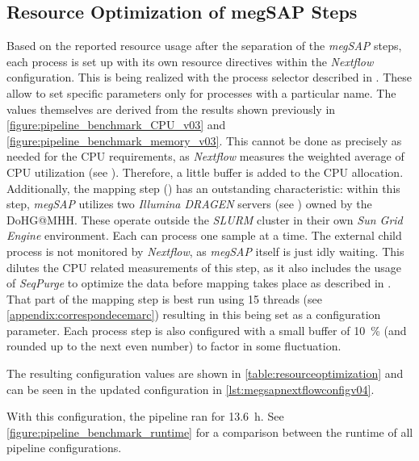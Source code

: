 \subsection{Resource Optimization of \acs{megSAP} Steps}\label{subsection:resourceoptimization}

Based on the reported resource usage after the separation of the \textit{\ac{megSAP}} steps, each process is set up with its own resource directives within the \textit{Nextflow} configuration. This is being realized with the  process selector described in \autocite[Process selectors]{SeqeraLabs2022e}. These allow to set specific parameters only for processes with a particular name. The values themselves are derived from the results shown previously in \cref{figure:pipeline_benchmark_CPU_v03} and \cref{figure:pipeline_benchmark_memory_v03}. This cannot be done as precisely as needed for the CPU requirements, as \textit{Nextflow} measures the weighted average of CPU utilization (see \autocite{SeqeraLabs2022d}). Therefore, a little buffer is added to the CPU allocation. Additionally, the mapping step () has an outstanding characteristic: within this step, \textit{\ac{megSAP}} utilizes two \textit{Illumina DRAGEN} servers (see \autocite{IlluminaInc.2022}) owned by the \ac{DoHG@MHH}. These operate outside the \textit{SLURM} cluster in their own \textit{Sun Grid Engine} environment. Each can process one sample at a time. The external child process is not monitored by \textit{Nextflow}, as \textit{\ac{megSAP}} itself is just idly waiting. This dilutes the CPU related measurements of this step, as it also includes the usage of \textit{SeqPurge} to optimize the data before mapping takes place as described in \autocite{Sturm2016}. That part of the mapping step is best run using 15 threads (see \cref{appendix:correspondecemarc}) resulting in this being set as a configuration parameter. Each process step is also configured with a small buffer of \SI{10}{\percent} (and rounded up to the next even number) to factor in some fluctuation. 

The resulting configuration values are shown in \cref{table:resourceoptimization} and can be seen in the updated configuration in \cref{lst:megsapnextflowconfigv04}.

With this configuration, the pipeline ran for \SI{13.6}{\hour}. See \cref{figure:pipeline_benchmark_runtime} for a comparison between the runtime of all pipeline configurations.

